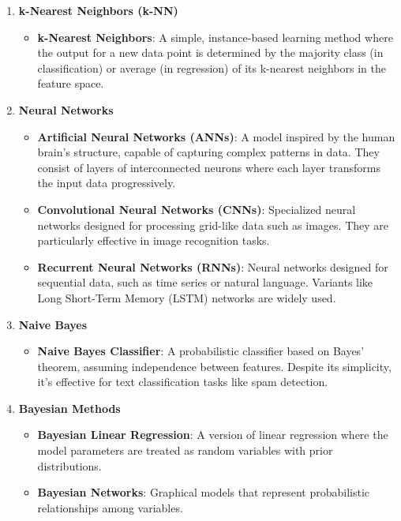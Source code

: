 \begin{enumerate}
    \item \textbf{k-Nearest Neighbors (k-NN)}
    \begin{itemize}
        \item \textbf{k-Nearest Neighbors}: A simple, instance-based learning method where the output for a new data point is determined by the majority class (in classification) or average (in regression) of its k-nearest neighbors in the feature space.
    \end{itemize}

    \item \textbf{Neural Networks}
    \begin{itemize}
        \item \textbf{Artificial Neural Networks (ANNs)}: A model inspired by the human brain's structure, capable of capturing complex patterns in data. They consist of layers of interconnected neurons where each layer transforms the input data progressively.
        \item \textbf{Convolutional Neural Networks (CNNs)}: Specialized neural networks designed for processing grid-like data such as images. They are particularly effective in image recognition tasks.
        \item \textbf{Recurrent Neural Networks (RNNs)}: Neural networks designed for sequential data, such as time series or natural language. Variants like Long Short-Term Memory (LSTM) networks are widely used.
    \end{itemize}

    \item \textbf{Naive Bayes}
    \begin{itemize}
        \item \textbf{Naive Bayes Classifier}: A probabilistic classifier based on Bayes' theorem, assuming independence between features. Despite its simplicity, it’s effective for text classification tasks like spam detection.
    \end{itemize}

    \item \textbf{Bayesian Methods}
    \begin{itemize}
        \item \textbf{Bayesian Linear Regression}: A version of linear regression where the model parameters are treated as random variables with prior distributions.
        \item \textbf{Bayesian Networks}: Graphical models that represent probabilistic relationships among variables.
    \end{itemize}


\end{enumerate}
